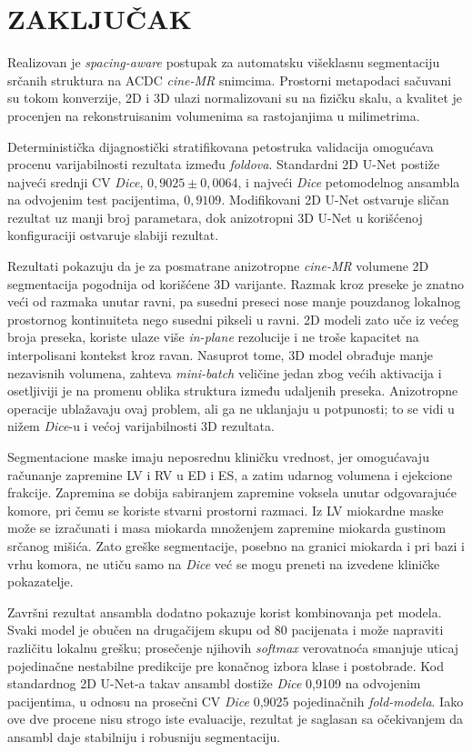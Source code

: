 \documentclass[11pt,a4paper]{article}
\begin{document}
\section{ZAKLJUČAK}
Realizovan je \textit{spacing-aware} postupak za automatsku višeklasnu segmentaciju srčanih struktura na
ACDC \textit{cine-MR} snimcima. Prostorni metapodaci sačuvani su tokom konverzije, 2D i 3D ulazi
normalizovani su na fizičku skalu, a kvalitet je procenjen na rekonstruisanim volumenima sa
rastojanjima u milimetrima.

Deterministička dijagnostički stratifikovana petostruka validacija omogućava procenu varijabilnosti
rezultata između \textit{foldova}. Standardni 2D U-Net postiže najveći srednji CV \textit{Dice},
$0{,}9025\pm0{,}0064$, i najveći \textit{Dice} petomodelnog ansambla na odvojenim test pacijentima,
$0{,}9109$. Modifikovani 2D U-Net ostvaruje sličan rezultat uz manji broj parametara, dok
anizotropni 3D U-Net u korišćenoj konfiguraciji ostvaruje slabiji rezultat.

Rezultati pokazuju da je za posmatrane anizotropne \textit{cine-MR} volumene 2D segmentacija pogodnija od
korišćene 3D varijante. Razmak kroz preseke je znatno veći od razmaka unutar ravni, pa susedni
preseci nose manje pouzdanog lokalnog prostornog kontinuiteta nego susedni pikseli u ravni. 2D
modeli zato uče iz većeg broja preseka, koriste ulaze više \textit{in-plane} rezolucije i ne troše kapacitet
na interpolisani kontekst kroz ravan. Nasuprot tome, 3D model obrađuje manje nezavisnih volumena,
zahteva \textit{mini-batch} veličine jedan zbog većih aktivacija i osetljiviji je na promenu oblika
struktura između udaljenih preseka. Anizotropne operacije ublažavaju ovaj problem, ali ga ne
uklanjaju u potpunosti; to se vidi u nižem \textit{Dice}-u i većoj varijabilnosti 3D rezultata.

Segmentacione maske imaju neposrednu kliničku vrednost, jer omogućavaju računanje zapremine LV i RV
u ED i ES, a zatim udarnog volumena i ejekcione frakcije. Zapremina se dobija sabiranjem zapremine
voksela unutar odgovarajuće komore, pri čemu se koriste stvarni prostorni razmaci. Iz LV miokardne
maske može se izračunati i masa miokarda množenjem zapremine miokarda gustinom srčanog mišića. Zato
greške segmentacije, posebno na granici miokarda i pri bazi i vrhu komora, ne utiču samo na \textit{Dice}
već se mogu preneti na izvedene kliničke pokazatelje.

Završni rezultat ansambla dodatno pokazuje korist kombinovanja pet modela. Svaki model je obučen na
drugačijem skupu od 80 pacijenata i može napraviti različitu lokalnu grešku; prosečenje njihovih
\textit{softmax} verovatnoća smanjuje uticaj pojedinačne nestabilne predikcije pre konačnog izbora klase i
postobrade. Kod standardnog 2D U-Net-a takav ansambl dostiže \textit{Dice} 0,9109 na odvojenim pacijentima,
u odnosu na prosečni CV \textit{Dice} 0,9025 pojedinačnih \textit{fold-modela}. Iako ove dve procene nisu strogo iste
evaluacije, rezultat je saglasan sa očekivanjem da ansambl daje stabilniju i robusniju
segmentaciju.
\end{document}
